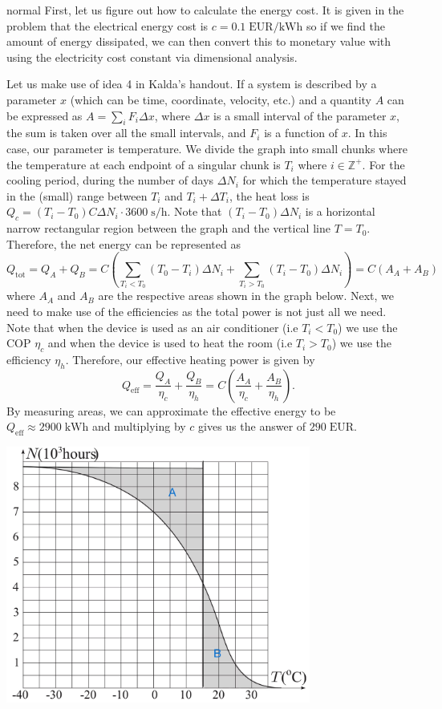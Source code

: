 \begin{solution}{normal}
First, let us figure out how to calculate the energy cost. It is given in the problem that the electrical energy cost is $c = 0.1\;\mathrm{EUR/kWh}$ so if we find the amount of energy dissipated, we can then convert this to monetary value with using the electricity cost constant via dimensional analysis.
\vspace{3mm}

\noindent Let us make use of idea 4 in Kalda’s handout. If a system is described by a parameter $x$ (which can be time, coordinate, velocity, etc.) and a quantity $A$ can be expressed as $A = \sum_i F_i \Delta x$, where $\Delta x$ is a small interval of the parameter $x$, the sum is taken over all the small intervals, and $F_i$ is a function of $x$. In this case, our parameter is temperature. We divide the graph into small chunks where the temperature at each endpoint of a singular chunk is $T_i$ where $i \in \mathbb{Z}^{+}$. For the cooling period, during the number of days $\Delta N_i$ for which the temperature stayed in the (small) range between $T_i$ and $T_i + \Delta T_i$, the heat loss is $Q_c = (T_i - T_0)C\Delta N_i\cdot 3600\;\mathrm{s/h}$. Note that $(T_i-T_0)\Delta N_i$ is a horizontal narrow rectangular region between the graph and the vertical line $T = T_0$. Therefore, the net energy can be represented as
\[Q_{\text{tot}} = Q_A + Q_B = C\left(\sum_{T_i < T_0} (T_0-T_i) \Delta N_i + \sum_{T_i > T_0} (T_i-T_0) \Delta N_i\right) = C(A_A + A_B)\]where $A_A$ and $A_B$ are the respective areas shown in the graph below. Next, we need to make use of the efficiencies as the total power is not just all we need. Note that when the device is used as an air conditioner (i.e $T_i < T_0$) we use the COP $\eta_c$ and when the device is used to heat the room (i.e $T_i > T_0$) we use the efficiency $\eta_h$. Therefore, our effective heating power is given by
\[Q_{\text{eff}} = \frac{Q_A}{\eta_c} + \frac{Q_B}{\eta_h} = C\left(\frac{A_A}{\eta_c} + \frac{A_B}{\eta_h}\right).\]By measuring areas, we can approximate the effective energy to be $Q_{\text{eff}} \approx 2900\;\mathrm{kWh}$ and multiplying by $c$ gives us the answer of $290\;\mathrm{EUR}$.
\begin{center}
    \includegraphics[width=10cm]{k46.jpg}
\end{center}
\end{solution}
